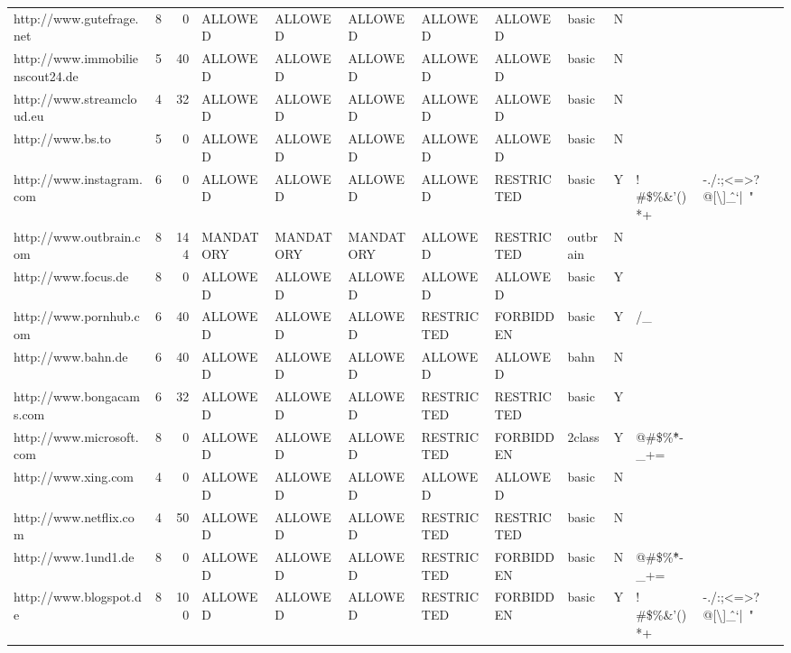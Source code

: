 \begin{table}[htbp]
{{\begin{tabular}{lrrlllllllrr}
    http://www.gutefrage.net & 8     & 0     & ALLOWED & ALLOWED & ALLOWED & ALLOWED & ALLOWED & basic & N     &       &  \\
    http://www.immobilienscout24.de & 5     & 40    & ALLOWED & ALLOWED & ALLOWED & ALLOWED & ALLOWED & basic & N     &       &  \\
    http://www.streamcloud.eu & 4     & 32    & ALLOWED & ALLOWED & ALLOWED & ALLOWED & ALLOWED & basic & N     &       &  \\
    http://www.bs.to & 5     & 0     & ALLOWED & ALLOWED & ALLOWED & ALLOWED & ALLOWED & basic & N     &       &  \\
    http://www.instagram.com & 6     & 0     & ALLOWED & ALLOWED & ALLOWED & ALLOWED & RESTRICTED & basic & Y     & \multicolumn{1}{l}{! \#\$\%\&'()*+} & \multicolumn{1}{l}{-./:;<=>?@[\textbackslash{}]\^\_`{|}~"} \\
    http://www.outbrain.com & 8     & 144   & MANDATORY & MANDATORY & MANDATORY & ALLOWED & RESTRICTED & outbrain & N     &       & \multicolumn{1}{l}{ } \\
    http://www.focus.de & 8     & 0     & ALLOWED & ALLOWED & ALLOWED & ALLOWED & ALLOWED & basic & Y     &       &  \\
    http://www.pornhub.com & 6     & 40    & ALLOWED & ALLOWED & ALLOWED & RESTRICTED & FORBIDDEN & basic & Y     & \multicolumn{1}{l}{/\_} &  \\
    http://www.bahn.de & 6     & 40    & ALLOWED & ALLOWED & ALLOWED & ALLOWED & ALLOWED & bahn  & N     &       &  \\
    http://www.bongacams.com & 6     & 32    & ALLOWED & ALLOWED & ALLOWED & RESTRICTED & RESTRICTED & basic & Y     &       &  \\
    http://www.microsoft.com & 8     & 0     & ALLOWED & ALLOWED & ALLOWED & RESTRICTED & FORBIDDEN & 2class & Y     & \multicolumn{1}{l}{@\#\$\%\^*-\_+=} &  \\
    http://www.xing.com & 4     & 0     & ALLOWED & ALLOWED & ALLOWED & ALLOWED & ALLOWED & basic & N     &       &  \\
    http://www.netflix.com & 4     & 50    & ALLOWED & ALLOWED & ALLOWED & RESTRICTED & RESTRICTED & basic & N     &       & \multicolumn{1}{l}{~} \\
    http://www.1und1.de & 8     & 0     & ALLOWED & ALLOWED & ALLOWED & RESTRICTED & FORBIDDEN & basic & N     & \multicolumn{1}{l}{@\#\$\%\^*-\_+=} &  \\
    http://www.blogspot.de & 8     & 100   & ALLOWED & ALLOWED & ALLOWED & RESTRICTED & FORBIDDEN & basic & Y     & \multicolumn{1}{l}{! \#\$\%\&'()*+} & \multicolumn{1}{l}{-./:;<=>?@[\textbackslash{}]\^\_`{|}~"} \\

\end{tabular}}}
\end{table}
